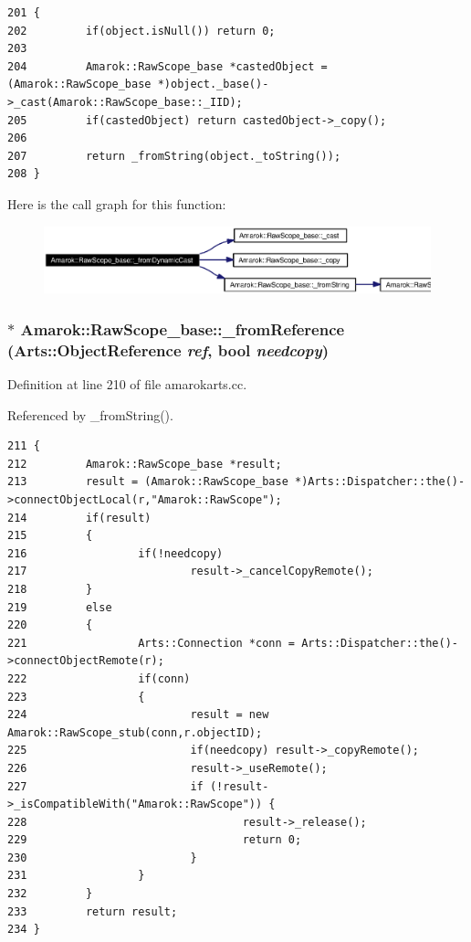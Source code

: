 \footnotesize\begin{verbatim}201 {
202         if(object.isNull()) return 0;
203 
204         Amarok::RawScope_base *castedObject = (Amarok::RawScope_base *)object._base()->_cast(Amarok::RawScope_base::_IID);
205         if(castedObject) return castedObject->_copy();
206 
207         return _fromString(object._toString());
208 }
\end{verbatim}\normalsize 


Here is the call graph for this function:\begin{figure}[H]
\begin{center}
\leavevmode
\includegraphics[width=366pt]{classAmarok_1_1RawScope__base_Amarok_1_1RawScope__stube3_cgraph}
\end{center}
\end{figure}
\subsubsection{ $\ast$ Amarok::Raw\-Scope\_\-base::\_\-from\-Reference (Arts::Object\-Reference {\em ref}, bool {\em needcopy})\hspace{0.3cm}{\tt  [static]}}\label{classAmarok_1_1RawScope__base_Amarok_1_1RawScope__stube2}




Definition at line 210 of file amarokarts.cc.

Referenced by \_\-from\-String().



\footnotesize\begin{verbatim}211 {
212         Amarok::RawScope_base *result;
213         result = (Amarok::RawScope_base *)Arts::Dispatcher::the()->connectObjectLocal(r,"Amarok::RawScope");
214         if(result)
215         {
216                 if(!needcopy)
217                         result->_cancelCopyRemote();
218         }
219         else
220         {
221                 Arts::Connection *conn = Arts::Dispatcher::the()->connectObjectRemote(r);
222                 if(conn)
223                 {
224                         result = new Amarok::RawScope_stub(conn,r.objectID);
225                         if(needcopy) result->_copyRemote();
226                         result->_useRemote();
227                         if (!result->_isCompatibleWith("Amarok::RawScope")) {
228                                 result->_release();
229                                 return 0;
230                         }
231                 }
232         }
233         return result;
234 }
\end{verbatim}\normalsize 
{}

